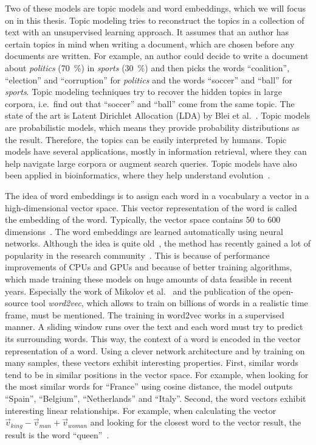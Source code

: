\documentclass[
        a4paper,
        titlepage,
        twoside,
        parskip,
        numbers=noenddot
        ]{scrbook}
\theoremstyle{break}
\begin{document}
Two of these models are topic models and word embeddings, which we will focus on in this thesis.
Topic modeling tries to reconstruct the topics in a collection of text with an unsupervised learning approach.
It assumes that an author has certain topics in mind when writing a document, which are chosen before any documents are written.
For example, an author could decide to write a document about \emph{politics} (70~\%) in \emph{sports} (30~\%) and then picks the words ``coalition'', ``election'' and ``corruption'' for \emph{politics} and the words ``soccer'' and ``ball'' for \emph{sports}.
Topic modeling techniques try to recover the hidden topics in large corpora, i.e.\ find out that ``soccer'' and ``ball'' come from the same topic.
The state of the art is Latent Dirichlet Allocation (LDA) by Blei et al.~\cite{Blei2003}.
Topic models are probabilistic models, which means they provide probability distributions as the result.
Therefore, the topics can be easily interpreted by humans.
Topic models have several applications, mostly in information retrieval, where they can help navigate large corpora or augment search queries.
Topic models have also been applied in bioinformatics, where they help understand evolution~\cite{Pritchard2000}.

The idea of word embeddings is to assign each word in a vocabulary a vector in a high-dimensional vector space.
This vector representation of the word is called the embedding of the word.
Typically, the vector space contains $50$ to $600$ dimensions~\cite{Mikolov2013}.
The word embeddings are learned automatically using neural networks.
Although the idea is quite old~\cite{Bengio2003,Rumelhart1988}, the method has recently gained a lot of popularity in the research community~\cite{Levy2014,Levy2014a,Mikolov2013b}.
This is because of performance improvements of CPUs and GPUs and because of better training algorithms, which made training these models on huge amounts of data feasible in recent years.
Especially the work of Mikolov et al.~\cite{Mikolov2013b,Mikolov2013,Mikolov2013a} and the publication of the open-source tool \emph{word2vec}, which allows to train on billions of words in a realistic time frame, must be mentioned.
The training in word2vec works in a supervised manner.
A sliding window runs over the text and each word must try to predict its surrounding words.
This way, the context of a word is encoded in the vector representation of a word.
Using a clever network architecture and by training on many samples, these vectors exhibit interesting properties.
First, similar words tend to be in similar positions in the vector space.
For example, when looking for the most similar words for ``France'' using cosine distance, the model outputs ``Spain'', ``Belgium'', ``Netherlands'' and ``Italy''.
Second, the word vectors exhibit interesting linear relationships.
For example, when calculating the vector $\vec{v}_{king} - \vec{v}_{man} + \vec{v}_{woman}$ and looking for the closest word to the vector result, the result is the word ``queen''~\cite{Mikolov2013b}.
\end{document}
